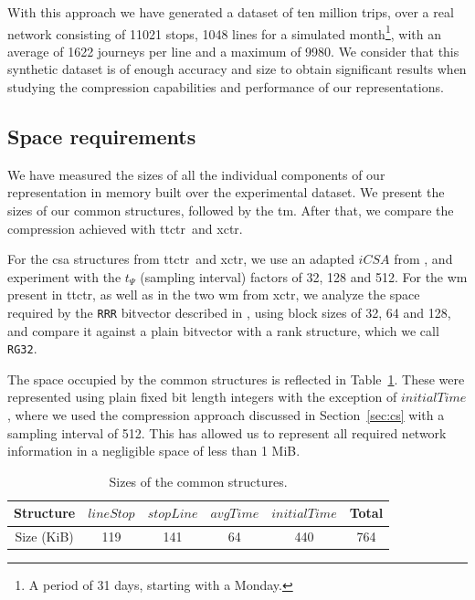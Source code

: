     With this approach we have generated a dataset of ten million trips, over a real network consisting of 11021 stops, 1048 lines for a simulated month\footnote{A period of 31 days, starting with a Monday.}, with an average of 1622 journeys per line and a maximum of 9980. We consider that this synthetic dataset is of enough accuracy and size to obtain significant results when studying the compression capabilities and performance of our representations.
    
    \subsection{Space requirements}
    \label{sec:newctr:exp:space}
    We have measured the sizes of all the individual components of our representation in memory built over the experimental dataset. We present the sizes of our common structures, followed by the \gls{tm}. After that, we compare the compression achieved with \gls{ttctr}~and \gls{xctr}.
    
    For the \gls{csa} structures from \gls{ttctr}~and \gls{xctr}, we use an adapted $iCSA$ from \cite{FBNCPR12}, and experiment with the $t_\Psi$ (sampling interval) factors of 32, 128 and 512. For the \gls{wm} present in \gls{ttctr}, as well as in the two \gls{wm} from \gls{xctr}, we analyze the space required by the \texttt{RRR} bitvector described in \cite{Raman:2002:SID:545381.545411}, using block sizes of 32, 64 and 128, and compare it against a plain bitvector with a rank structure, which we call \texttt{RG32}.
    
    The space occupied by the common structures is reflected in Table~\ref{tab:commons}. These were represented using plain fixed bit length integers with the exception of $initialTime$, where we used the compression approach discussed in Section~\ref{sec:cs} with a sampling interval of 512. This has allowed us to represent all required network information in a negligible space of less than 1 MiB.
    
    \begin{table}[ht]
        \centering
        \caption{Sizes of the common structures.}
        \label{tab:commons}
        \begin{tabular}{|c|c|c|c|c|c|}
        \hline
            Structure & $lineStop$ & $stopLine$ & $avgTime$ & $initialTime$ & Total \\
            \hline
            Size (KiB) & 119 & 141 & 64 & 440 & 764 \\
        \hline
        \end{tabular}
    \end{table}
    
